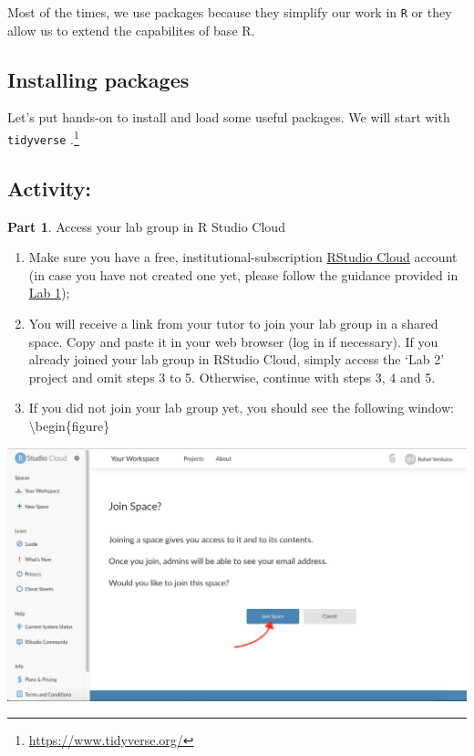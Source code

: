 \documentclass[
]{book}
\providecommand{\tightlist}{%
  \setlength{\itemsep}{0pt}\setlength{\parskip}{0pt}}
\begin{document}
Most of the times, we use packages because they simplify our work in \texttt{R} or they allow us to extend the capabilites of base R.

\hypertarget{installing-packages}{%
\subsection{Installing packages}\label{installing-packages}}

Let's put hands-on to install and load some useful packages. We will start with \texttt{tidyverse} \citep{R-tidyverse}.\footnote{\url{https://www.tidyverse.org/}}

\hypertarget{activity-1}{%
\subsection{Activity:}\label{activity-1}}

\textbf{Part 1}. Access your lab group in R Studio Cloud

\begin{enumerate}
\def\labelenumi{\arabic{enumi}.}
\tightlist
\item
  Make sure you have a free, institutional-subscription \href{https://rstudio.cloud/}{RStudio Cloud} account (in case you have not created one yet, please follow the guidance provided in \protect\hyperlink{lab-intro}{Lab 1});
\item
  You will receive a link from your tutor to join your lab group in a shared space. Copy and paste it in your web browser (log in if necessary). If you already joined your lab group in RStudio Cloud, simply access the `Lab 2' project and omit steps 3 to 5. Otherwise, continue with steps 3, 4 and 5.
\item
  If you did not join your lab group yet, you should see the following window:
  \textbackslash begin\{figure\}
\end{enumerate}

\includegraphics[width=1\linewidth]{./images/rstudio_cloud_joinspace} \hfill{}
\end{document}

